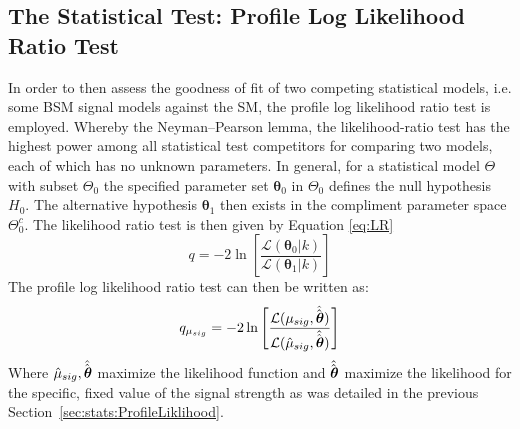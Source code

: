 \subsection{The Statistical Test: Profile Log Likelihood Ratio Test}
\label{sec:stats:LikelihoodRatio}
In order to then assess the goodness of fit of two competing statistical models, i.e. some BSM signal models against the SM, the profile log likelihood ratio test is employed. 
Whereby the Neyman–Pearson lemma, the likelihood-ratio test has the highest power among all statistical test competitors for comparing two models, each of which has no unknown parameters.
In general, for a statistical model $\Theta$ with subset $\Theta_{0}$ the specified parameter set $\boldsymbol\theta_{0}$ in $\Theta_{0}$ defines the null hypothesis $H_{0}$.
The alternative hypothesis $\boldsymbol\theta_{1}$ then exists in the compliment parameter space $\Theta_{0}^{c}$.
The likelihood ratio test is then given by Equation \ref{eq:LR}
\begin{equation}
    q = -2\ln\left[ \frac{\mathcal{L}(\boldsymbol\theta_{0}|k)}{\mathcal{L}(\boldsymbol\theta_{1}|k)} \right]
    \label{eq:LR}
\end{equation}
The profile log likelihood ratio test can then be written as:
\begin{equation}
    q_{\mu_{sig}} = -2\ln\left[ \frac{\mathcal{L}(\mu_{sig}, \hat{\vphantom{\rule{1pt}{0.1ex}}\hat{\boldsymbol{\theta}}})}{\mathcal{L}(\hat{\mu}_{sig},\hat{\vphantom{\rule{1pt}{0.1ex}}\hat{\boldsymbol{\theta}}})} \right]
    \label{eq:pLR}
\end{equation}
Where $\hat{\mu}_{sig}, \hat{\vphantom{\rule{1pt}{0.1ex}}\hat{\boldsymbol{\theta}}}$  maximize the likelihood function and $\hat{\vphantom{\rule{1pt}{0.1ex}}\hat{\boldsymbol{\theta}}}$ maximize the likelihood for the specific, fixed value of the signal strength as was detailed in the previous Section~\ref{sec:stats:ProfileLiklihood}.
